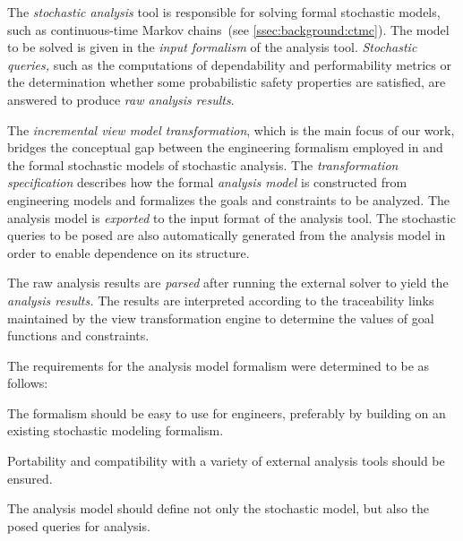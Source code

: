 The \emph{stochastic analysis} tool is responsible for solving formal stochastic models, such as continuous-time Markov chains~(see \vref{ssec:background:ctmc}). The model to be solved is given in the \emph{input formalism} of the analysis tool. \emph{Stochastic queries,} such as the computations of dependability and performability metrics or the determination whether some probabilistic safety properties are satisfied, are answered to produce \emph{raw analysis results}. 

The \emph{incremental view model transformation}, which is the main focus of our work, bridges the conceptual gap between the engineering formalism employed in  and the formal stochastic models of stochastic analysis. The \emph{transformation specification} describes how the formal \emph{analysis model} is constructed from engineering models and formalizes the goals and constraints to be analyzed. The analysis model is \emph{exported} to the input format of the analysis tool. The stochastic queries to be posed are also automatically generated from the analysis model in order to enable dependence on its structure.

The raw analysis results are \emph{parsed} after running the external solver to yield the \emph{analysis results.} The results are interpreted according to the traceability links maintained by the view transformation engine to determine the values of goal functions and constraints.

The requirements for the analysis model formalism were determined to be as follows:
\begin{enumerate*}
\item The formalism should be easy to use for engineers, preferably by building on an existing stochastic modeling formalism.
\item Portability and compatibility with a variety of external analysis tools should be ensured.
\item The analysis model should define not only the stochastic model, but also the posed queries for analysis.
\end{enumerate*}

